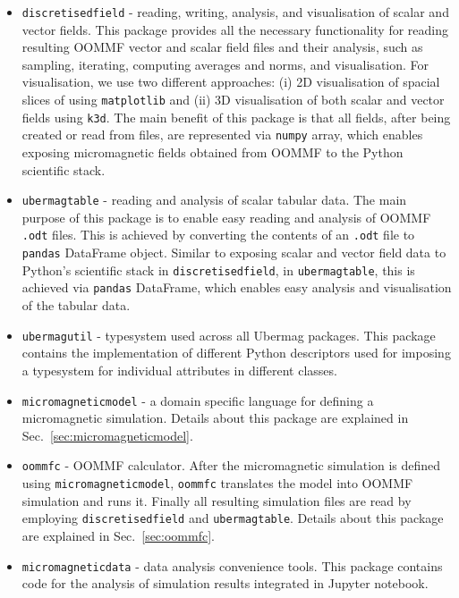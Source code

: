\documentclass{deliverablereport}
\begin{document}
\begin{itemize}
\item \texttt{discretisedfield} - reading, writing, analysis, and visualisation of scalar and vector fields. This package provides all the necessary functionality for reading resulting OOMMF vector and scalar field files and their analysis, such as sampling, iterating, computing averages and norms, and visualisation. For visualisation, we use two different approaches: (i) 2D visualisation of spacial slices of using \texttt{matplotlib} and (ii) 3D visualisation of both scalar and vector fields using \texttt{k3d}. The main benefit of this package is that all fields, after being created or read from files, are represented via \texttt{numpy} array, which enables exposing micromagnetic fields obtained from OOMMF to the Python scientific stack.
\item \texttt{ubermagtable} - reading and analysis of scalar tabular data. The main purpose of this package is to enable easy reading and analysis of OOMMF \texttt{.odt} files. This is achieved by converting the contents of an \texttt{.odt} file to \texttt{pandas} DataFrame object. Similar to exposing scalar and vector field data to Python's scientific stack in \texttt{discretisedfield}, in \texttt{ubermagtable}, this is achieved via \texttt{pandas} DataFrame, which enables easy analysis and visualisation of the tabular data.
\item \texttt{ubermagutil} - typesystem used across all Ubermag packages. This package contains the implementation of different Python descriptors used for imposing a typesystem for individual attributes in different classes.
\item \texttt{micromagneticmodel} - a domain specific language for defining a micromagnetic simulation. Details about this package are explained in Sec.~\ref{sec:micromagneticmodel}.
\item \texttt{oommfc} - OOMMF calculator. After the micromagnetic simulation is defined using \texttt{micromagneticmodel}, \texttt{oommfc} translates the model into OOMMF simulation and runs it. Finally all resulting simulation files are read by employing \texttt{discretisedfield} and \texttt{ubermagtable}. Details about this package are explained in Sec.~\ref{sec:oommfc}.
  \item \texttt{micromagneticdata} - data analysis convenience tools. This package contains code for the analysis of simulation results integrated in Jupyter notebook.
\end{itemize}
\end{document}
